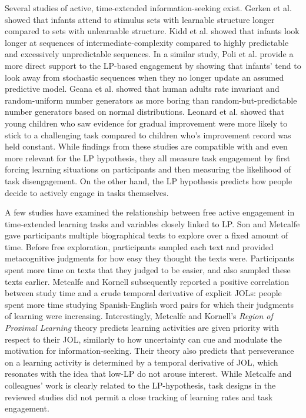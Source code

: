 Several studies of active, time-extended information-seeking exist. Gerken et al. \cite{gerken_infants_2011} showed that infants attend to stimulus sets with learnable structure longer compared to sets with unlearnable structure. Kidd et al. \cite{kidd_goldilocks_2012} showed that infants look longer at sequences of intermediate-complexity compared to highly predictable and excessively unpredictable sequences. In a similar study, Poli et al. \cite{poli_infants_2020} provide a more direct support to the \ac{LP}-based engagement by showing that infants' tend to look away from stochastic sequences when they no longer update an assumed predictive model. Geana et al. \cite{geana_boredom_2016} showed that human adults rate invariant and random-uniform number generators as more boring than random-but-predictable number generators based on normal distributions. Leonard et al. \cite{leonard_young_2021} showed that young children who saw evidence for gradual improvement were more likely to stick to a challenging task compared to children who's improvement record was held constant.  While findings from these studies are compatible with and even more relevant for the \ac{LP} hypothesis, they all measure task engagement by first forcing learning situations on participants and then measuring the likelihood of task disengagement. On the other hand, the \ac{LP} hypothesis predicts how people decide to actively engage in tasks themselves.

A few studies have examined the relationship between free active engagement in time-extended learning tasks and variables closely linked to \ac{LP}. Son and Metcalfe \cite{son_metacognitive_2000} gave participants multiple biographical texts to explore over a fixed amount of time. Before free exploration, participants sampled each text and provided metacognitive judgments for how easy they thought the texts were. Participants spent more time on texts that they judged to be easier, and also sampled these texts earlier. Metcalfe and Kornell \cite{metcalfe_region_2005} subsequently reported a positive correlation between study time and a crude temporal derivative of explicit \acp{JOL}: people spent more time studying Spanish-English word pairs for which their judgments of learning were increasing. Interestingly, Metcalfe and Kornell's \emph{Region of Proximal Learning} theory \cite{metcalfe_region_2005} predicts learning activities are given priority with respect to their \ac{JOL}, similarly to how uncertainty can cue and modulate the motivation for information-seeking. Their theory also predicts that perseverance on a learning activity is determined by a temporal derivative of \ac{JOL}, which resonates with the idea that low-\ac{LP} do not arouse interest. While Metcalfe and colleagues' work is clearly related to the \ac{LP}-hypothesis, task designs in the reviewed studies did not permit a close tracking of learning rates and task engagement.

